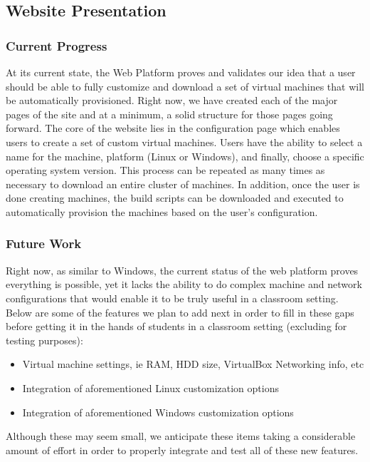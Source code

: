 \documentclass[openright]{report}
\begin{document}
\subsection{Website Presentation}

\subsubsection{Current Progress}
At its current state, the Web Platform proves and validates our idea that a user should be able to fully customize and download a set of virtual machines that will be automatically provisioned. Right now, we have created each of the major pages of the site and at a minimum, a solid structure for those pages going forward. The core of the website lies in the configuration page which enables users to create a set of custom virtual machines. Users have the ability to select a name for the machine, platform (Linux or Windows), and finally, choose a specific operating system version. This process can be repeated as many times as necessary to download an entire cluster of machines. In addition, once the user is done creating machines, the build scripts can be downloaded and executed to automatically provision the machines based on the user's configuration.

\subsubsection{Future Work}
Right now, as similar to Windows, the current status of the web platform proves everything is possible, yet it lacks the ability to do complex machine and network configurations that would enable it to be truly useful in a classroom setting. Below are some of the features we plan to add next in order to fill in these gaps before getting it in the hands of students in a classroom setting (excluding for testing purposes):

\begin{itemize}
    \item Virtual machine settings, ie RAM, HDD size, VirtualBox Networking info, etc
    \item Integration of aforementioned Linux customization options
    \item Integration of aforementioned Windows customization options
\end{itemize}

\noindent Although these may seem small, we anticipate these items taking a considerable amount of effort in order to properly integrate and test all of these new features.
\end{document}
